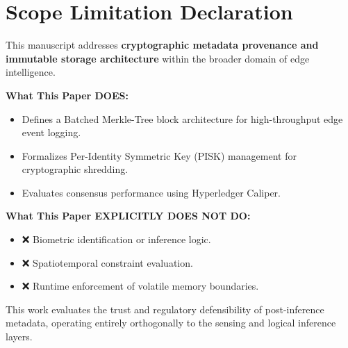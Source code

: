 \documentclass[conference]{IEEEtran}
\begin{document}
\section*{Scope Limitation Declaration}
This manuscript addresses \textbf{cryptographic metadata provenance and immutable storage architecture} within the broader domain of edge intelligence.

\textbf{What This Paper DOES:}
\begin{itemize}
    \item Defines a Batched Merkle-Tree block architecture for high-throughput edge event logging.
    \item Formalizes Per-Identity Symmetric Key (PISK) management for cryptographic shredding.
    \item Evaluates consensus performance using Hyperledger Caliper.
\end{itemize}

\textbf{What This Paper EXPLICITLY DOES NOT DO:}
\begin{itemize}
    \item ❌ Biometric identification or inference logic.
    \item ❌ Spatiotemporal constraint evaluation.
    \item ❌ Runtime enforcement of volatile memory boundaries.
\end{itemize}

This work evaluates the trust and regulatory defensibility of post-inference metadata, operating entirely orthogonally to the sensing and logical inference layers.
\end{document}
